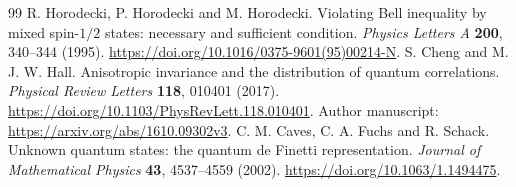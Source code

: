 \documentclass[11pt,a4paper]{article}
\begin{document}
\setcounter{section}{4}

\clearpage
\begin{thebibliography}{99}
R. Horodecki, P. Horodecki and M. Horodecki.
Violating Bell inequality by mixed spin-$1/2$ states: necessary and sufficient condition.
\emph{Physics Letters A} \textbf{200}, 340--344 (1995).
\url{https://doi.org/10.1016/0375-9601(95)00214-N}.
S. Cheng and M. J. W. Hall.
Anisotropic invariance and the distribution of quantum correlations.
\emph{Physical Review Letters} \textbf{118}, 010401 (2017).
\url{https://doi.org/10.1103/PhysRevLett.118.010401}.
Author manuscript: \url{https://arxiv.org/abs/1610.09302v3}.
C. M. Caves, C. A. Fuchs and R. Schack.
Unknown quantum states: the quantum de Finetti representation.
\emph{Journal of Mathematical Physics} \textbf{43}, 4537--4559 (2002).
\url{https://doi.org/10.1063/1.1494475}.
\end{thebibliography}
\end{document}
